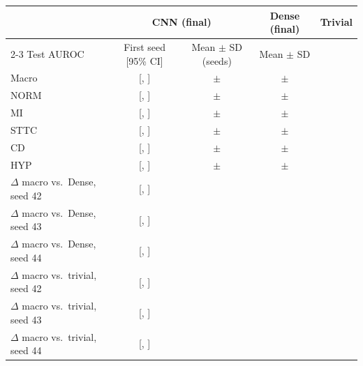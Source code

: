 \begin{tabular}{lcccc}
\toprule
 & \multicolumn{2}{c}{CNN (final)} & Dense (final) & Trivial \\
\cmidrule(lr){2-3}
Test AUROC & First seed [95\% CI] & Mean $\pm$ SD (seeds) & Mean $\pm$ SD &  \\
\midrule
Macro & \cnnFinalFirstTestMacroAuroc{} [\cnnFinalFirstTestMacroAurocLo{}, \cnnFinalFirstTestMacroAurocHi{}] & \cnnFinalTestMacroAurocMean{} $\pm$ \cnnFinalTestMacroAurocSd{} & \denseFinalTestMacroAurocMean{} $\pm$ \denseFinalTestMacroAurocSd{} & \trivialTestMacroAuroc{} \\
\midrule
NORM & \cnnFinalFirstTestAurocNORM{} [\cnnFinalFirstTestAurocNORMLo{}, \cnnFinalFirstTestAurocNORMHi{}] & \cnnFinalTestAurocNORMMean{} $\pm$ \cnnFinalTestAurocNORMSd{} & \denseFinalTestAurocNORMMean{} $\pm$ \denseFinalTestAurocNORMSd{} & \trivialTestAurocNORM{} \\
MI & \cnnFinalFirstTestAurocMI{} [\cnnFinalFirstTestAurocMILo{}, \cnnFinalFirstTestAurocMIHi{}] & \cnnFinalTestAurocMIMean{} $\pm$ \cnnFinalTestAurocMISd{} & \denseFinalTestAurocMIMean{} $\pm$ \denseFinalTestAurocMISd{} & \trivialTestAurocMI{} \\
STTC & \cnnFinalFirstTestAurocSTTC{} [\cnnFinalFirstTestAurocSTTCLo{}, \cnnFinalFirstTestAurocSTTCHi{}] & \cnnFinalTestAurocSTTCMean{} $\pm$ \cnnFinalTestAurocSTTCSd{} & \denseFinalTestAurocSTTCMean{} $\pm$ \denseFinalTestAurocSTTCSd{} & \trivialTestAurocSTTC{} \\
CD & \cnnFinalFirstTestAurocCD{} [\cnnFinalFirstTestAurocCDLo{}, \cnnFinalFirstTestAurocCDHi{}] & \cnnFinalTestAurocCDMean{} $\pm$ \cnnFinalTestAurocCDSd{} & \denseFinalTestAurocCDMean{} $\pm$ \denseFinalTestAurocCDSd{} & \trivialTestAurocCD{} \\
HYP & \cnnFinalFirstTestAurocHYP{} [\cnnFinalFirstTestAurocHYPLo{}, \cnnFinalFirstTestAurocHYPHi{}] & \cnnFinalTestAurocHYPMean{} $\pm$ \cnnFinalTestAurocHYPSd{} & \denseFinalTestAurocHYPMean{} $\pm$ \denseFinalTestAurocHYPSd{} & \trivialTestAurocHYP{} \\
\midrule
$\Delta$ macro vs.\ Dense, seed 42 & \cnnDiffDenseSFourTwo{} [\cnnDiffDenseLoSFourTwo{}, \cnnDiffDenseHiSFourTwo{}] & & & \\
$\Delta$ macro vs.\ Dense, seed 43 & \cnnDiffDenseSFourThree{} [\cnnDiffDenseLoSFourThree{}, \cnnDiffDenseHiSFourThree{}] & & & \\
$\Delta$ macro vs.\ Dense, seed 44 & \cnnDiffDenseSFourFour{} [\cnnDiffDenseLoSFourFour{}, \cnnDiffDenseHiSFourFour{}] & & & \\
$\Delta$ macro vs.\ trivial, seed 42 & \cnnDiffTrivialSFourTwo{} [\cnnDiffTrivialLoSFourTwo{}, \cnnDiffTrivialHiSFourTwo{}] & & & \\
$\Delta$ macro vs.\ trivial, seed 43 & \cnnDiffTrivialSFourThree{} [\cnnDiffTrivialLoSFourThree{}, \cnnDiffTrivialHiSFourThree{}] & & & \\
$\Delta$ macro vs.\ trivial, seed 44 & \cnnDiffTrivialSFourFour{} [\cnnDiffTrivialLoSFourFour{}, \cnnDiffTrivialHiSFourFour{}] & & & \\
\bottomrule
\end{tabular}
